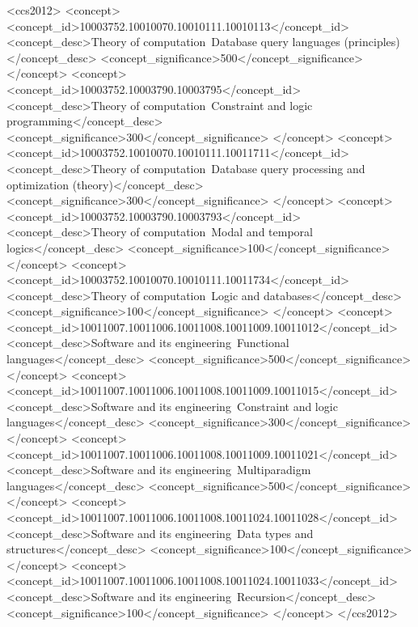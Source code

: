 \documentclass[acmsmall,screen]{acmart}\settopmatter{}
\begin{document}


\begin{CCSXML}
<ccs2012>
<concept>
<concept_id>10003752.10010070.10010111.10010113</concept_id>
<concept_desc>Theory of computation~Database query languages (principles)</concept_desc>
<concept_significance>500</concept_significance>
</concept>
<concept>
<concept_id>10003752.10003790.10003795</concept_id>
<concept_desc>Theory of computation~Constraint and logic programming</concept_desc>
<concept_significance>300</concept_significance>
</concept>
<concept>
<concept_id>10003752.10010070.10010111.10011711</concept_id>
<concept_desc>Theory of computation~Database query processing and optimization (theory)</concept_desc>
<concept_significance>300</concept_significance>
</concept>
<concept>
<concept_id>10003752.10003790.10003793</concept_id>
<concept_desc>Theory of computation~Modal and temporal logics</concept_desc>
<concept_significance>100</concept_significance>
</concept>
<concept>
<concept_id>10003752.10010070.10010111.10011734</concept_id>
<concept_desc>Theory of computation~Logic and databases</concept_desc>
<concept_significance>100</concept_significance>
</concept>
<concept>
<concept_id>10011007.10011006.10011008.10011009.10011012</concept_id>
<concept_desc>Software and its engineering~Functional languages</concept_desc>
<concept_significance>500</concept_significance>
</concept>
<concept>
<concept_id>10011007.10011006.10011008.10011009.10011015</concept_id>
<concept_desc>Software and its engineering~Constraint and logic languages</concept_desc>
<concept_significance>300</concept_significance>
</concept>
<concept>
<concept_id>10011007.10011006.10011008.10011009.10011021</concept_id>
<concept_desc>Software and its engineering~Multiparadigm languages</concept_desc>
<concept_significance>500</concept_significance>
</concept>
<concept>
<concept_id>10011007.10011006.10011008.10011024.10011028</concept_id>
<concept_desc>Software and its engineering~Data types and structures</concept_desc>
<concept_significance>100</concept_significance>
</concept>
<concept>
<concept_id>10011007.10011006.10011008.10011024.10011033</concept_id>
<concept_desc>Software and its engineering~Recursion</concept_desc>
<concept_significance>100</concept_significance>
</concept>
</ccs2012>
\end{CCSXML}

\end{document}
